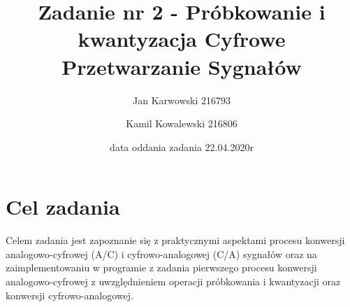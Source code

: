 \documentclass[12pt]{article}
\title{{\bf Zadanie nr 2 - Próbkowanie i kwantyzacja}\linebreak
    Cyfrowe Przetwarzanie Sygnałów}
\author{Jan Karwowski 216793 \and Kamil Kowalewski 216806}
\date{data oddania zadania 22.04.2020r}
\begin{document}
    \clearpage\maketitle
    \thispagestyle{empty}
    \newpage
    \setcounter{page}{1}
    \section{Cel zadania} {
        Celem zadania jest zapoznanie się z praktycznymi aspektami procesu konwersji
        analogowo-cyfrowej (A/C) i cyfrowo-analogowej (C/A) sygnałów oraz na zaimplementowaniu
        w programie z zadania pierwszego procesu konwersji analogowo-cyfrowej z uwzględnieniem
        operacji próbkowania i kwantyzacji oraz konwersji cyfrowo-analogowej.
    }
\end{document}
